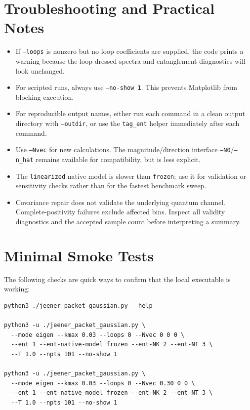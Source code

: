 \documentclass[11pt]{article}
\begin{document}
\section{Troubleshooting and Practical Notes}
\begin{itemize}
\item If \texttt{--loops} is nonzero but no loop coefficients are supplied, the code
prints a warning because the loop-dressed spectra and entanglement diagnostics
will look unchanged.
\item For scripted runs, always use \texttt{--no-show 1}. This prevents Matplotlib
from blocking execution.
\item For reproducible output names, either run each command in a clean output
directory with \texttt{--outdir}, or use the \texttt{tag\_ent} helper immediately
after each command.
\item Use \texttt{--Nvec} for new calculations. The magnitude/direction interface
\texttt{--N0}/\texttt{--n\_hat} remains available for compatibility, but is less
explicit.
\item The \texttt{linearized} native model is slower than \texttt{frozen}; use it for
validation or sensitivity checks rather than for the fastest benchmark sweep.
\item Covariance repair does not validate the underlying quantum channel.
Complete-positivity failures exclude affected bins. Inspect all validity
diagnostics and the accepted sample count before interpreting a summary.
\end{itemize}

\section{Minimal Smoke Tests}
The following checks are quick ways to confirm that the local executable is
working:
\begin{lstlisting}[style=bashstyle]
python3 ./jeener_packet_gaussian.py --help

python3 -u ./jeener_packet_gaussian.py \
  --mode eigen --kmax 0.03 --loops 0 --Nvec 0 0 0 \
  --ent 1 --ent-native-model frozen --ent-NK 2 --ent-NT 3 \
  --T 1.0 --npts 101 --no-show 1

python3 -u ./jeener_packet_gaussian.py \
  --mode eigen --kmax 0.03 --loops 0 --Nvec 0.30 0 0 \
  --ent 1 --ent-native-model frozen --ent-NK 2 --ent-NT 3 \
  --T 1.0 --npts 101 --no-show 1
\end{lstlisting}
\end{document}
